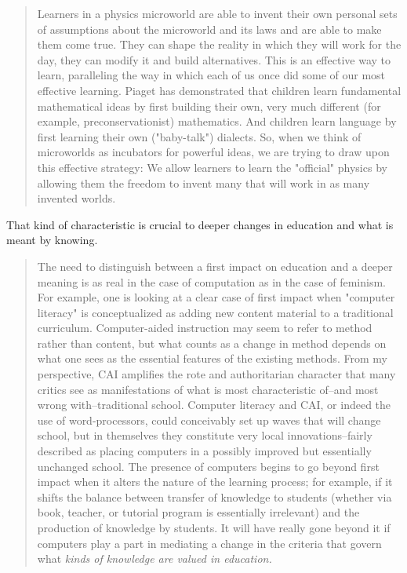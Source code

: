 \begin{quotation}
    Learners in a physics microworld are able to invent their own personal sets of
    assumptions about the microworld and its laws and are able to make them come
    true.  They can shape the reality in which they will work for the day, they can
    modify it and build alternatives.  This is an effective way to learn,
    paralleling the way in which each of us once did some of our most effective
    learning. Piaget has demonstrated that children learn fundamental mathematical
    ideas by first building their own, very much different (for example,
    preconservationist) mathematics. And children learn language by first learning
    their own ("baby-talk") dialects. So, when we think of microworlds as incubators
    for powerful ideas, we are trying to draw upon this effective strategy: We allow
    learners to learn the "official" physics by allowing them the freedom to invent
    many that will work in as many invented worlds.
\cite{education:papert_mindstorms}
\end{quotation}

That kind of characteristic is crucial to deeper changes in education and what
is meant by knowing. 

\begin{quotation}
    The need to distinguish between a first impact on education and a deeper meaning
    is as real in the case of computation as in the case of feminism. For example,
    one is looking at a clear case of first impact when "computer literacy" is
    conceptualized as adding new content material to a traditional curriculum.
    Computer-aided instruction may seem to refer to method rather than content, but
    what counts as a change in method depends on what one sees as the essential
    features of the existing methods. From my perspective, CAI amplifies the rote
    and authoritarian character that many critics see as manifestations of what is
    most characteristic of--and most wrong with--traditional school. Computer
    literacy and CAI, or indeed the use of word-processors, could conceivably set up
    waves that will change school, but in themselves they constitute very local
    innovations--fairly described as placing computers in a possibly improved but
    essentially unchanged school. The presence of computers begins to go beyond
    first impact when it alters the nature of the learning process; for example, if
    it shifts the balance between transfer of knowledge to students (whether via
    book, teacher, or tutorial program is essentially irrelevant) and the production
    of knowledge by students. It will have really gone beyond it if computers play a
    part in mediating a change in the criteria that govern what \emph{kinds of knowledge
    are valued in education.} 
\cite{education:papert__situating_constructionism}
\end{quotation}


